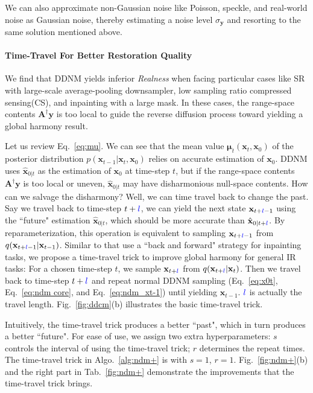 \documentclass{article} \usepackage{iclr2023_conference,times}
\begin{document}
We can also approximate non-Gaussian noise like Poisson, speckle, and real-world noise as Gaussian noise, thereby estimating a noise level $\sigma_{\mathbf{y}}$ and resorting to the same solution mentioned above.

\paragraph{Time-Travel For Better Restoration Quality} We find that DDNM yields inferior \textit{Realness} when facing particular cases like SR with large-scale average-pooling downsampler, low sampling ratio compressed sensing(CS), and inpainting with a large mask. In these cases, the range-space contents $\mathbf{A}^{\dagger}\mathbf{y}$ is too local to guide the reverse diffusion process toward yielding a global harmony result.

Let us review Eq.~\ref{eq:mu}. We can see that the mean value $\boldsymbol{\mu}_{t}(\mathbf{x}_{t},\mathbf{x}_{0})$ of the posterior distribution $p(\mathbf{x}_{t-1}|\mathbf{x}_{t},\mathbf{x}_{0})$ relies on accurate estimation of $\mathbf{x}_{0}$. DDNM uses $\hat{\mathbf{x}}_{0|t}$ as the estimation of $\mathbf{x}_{0}$ at time-step $t$, but if the range-space contents $\mathbf{A}^{\dagger}\mathbf{y}$ is too local or uneven, $\hat{\mathbf{x}}_{0|t}$ may have disharmonious null-space contents. How can we salvage the disharmony? Well, we can time travel back to change the past. Say we travel back to time-step $t+\textcolor{blue}{l}$, we can yield the next state $\mathbf{x}_{t+\textcolor{blue}{l}-1}$ using the ``future" estimation  $\hat{\mathbf{x}}_{0|t}$, which should be more accurate than $\hat{\mathbf{x}}_{0|t+\textcolor{blue}{l}}$. By reparameterization, this operation is equivalent to sampling $\mathbf{x}_{t+\textcolor{blue}{l}-1}$ from $q(\mathbf{x}_{t+\textcolor{blue}{l}-1}|\mathbf{x}_{t-1})$. Similar to \cite{lugmayr2022repaint} that use a ``back and forward" strategy for inpainting tasks, we propose a time-travel trick to improve global harmony for general IR tasks: For a chosen time-step $t$, we sample $\mathbf{x}_{t+\textcolor{blue}{l}}$ from $q(\mathbf{x}_{t+\textcolor{blue}{l}}|\mathbf{x}_{t})$. Then we travel back to time-step $t+\textcolor{blue}{l}$ and repeat normal DDNM sampling (Eq.~\ref{eq:x0t}, Eq.~\ref{eq:ndm core}, and Eq.~\ref{eq:ndm_xt-1}) until yielding $\mathbf{x}_{t-1}$. $\textcolor{blue}{l}$ is actually the travel length. Fig.~\ref{fig:ddcm}(b) illustrates the basic time-travel trick.

Intuitively, the time-travel trick produces a better ``past", which in turn produces a better ``future". For ease of use, we assign two extra hyperparameters: $s$ controls the interval of using the time-travel trick; $r$ determines the repeat times. The time-travel trick in Algo.~\ref{alg:ndm+} is with $s=1$, $r=1$. Fig.~\ref{fig:ndm+}(b) and the right part in Tab.~\ref{fig:ndm+} demonstrate the improvements that the time-travel trick brings. 
\end{document}
